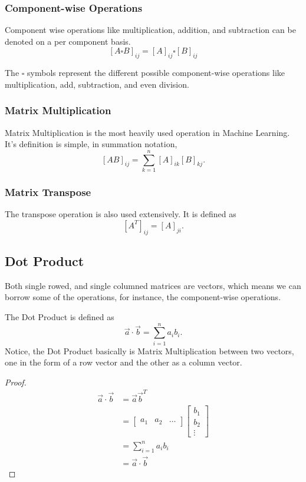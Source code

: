 \documentclass{article}
\begin{document}
\subsubsection{Component-wise Operations}

Component wise operations like multiplication, addition, and subtraction can be denoted on a per component basis. $$[A\square B]_{ij}=[A]_{ij} \square [B]_{ij}$$

The $\square$ symbols represent the different possible component-wise operations like multiplication, add, subtraction, and even division.

\subsubsection{Matrix Multiplication}

Matrix Multiplication is the most heavily used operation in Machine Learning. It's definition is simple, in summation notation, $$[AB]_{ij}=\sum_{k=1}^n [A]_{ik}[B]_{kj}.$$

\subsubsection{Matrix Transpose}

The transpose operation is also used extensively. It is defined as $$[A^T]_{ij}=[A]_{ji}.$$

\subsection{Dot Product}

Both single rowed, and single columned matrices are vectors, which means we can borrow some of the operations, for instance, the component-wise operations.

The Dot Product is defined as $$\vec{a}\cdot \vec{b}=\sum_{i=1}^n a_i b_i.$$ Notice, the Dot Product basically is Matrix Multiplication between two vectors, one in the form of a row vector and the other as a column vector. 

\begin{proof}
\begin{align*}
\vec{a}\cdot \vec{b}&=\vec{a}\vec{b}^T\\
&=\begin{bmatrix}a_1 & a_2 & \dots \end{bmatrix}
\begin{bmatrix}b_1 \\ b_2 \\ \vdots \end{bmatrix}\\
&=\sum_{i=1}^na_i b_i \\
&=\vec{a}\cdot \vec{b}
\end{align*}
\end{proof}
\end{document}
